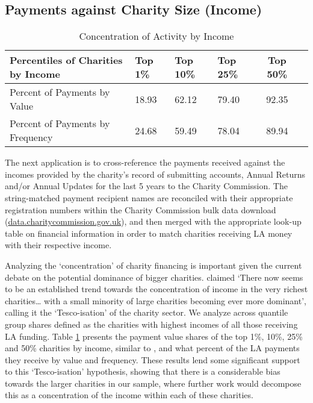 \documentclass[11pt]{article}
\begin{document}
\subsection{Payments against Charity Size (Income)}

\begin{table}[!b]
\centering
\caption{Concentration of Activity by Income}
\label{concentrationtable}
\begin{tabular}{llllcc}\toprule
Percentiles of Charities by Income & Top 1\% & Top 10\% &  Top 25\% &  Top 50\% \\ \midrule
Percent of Payments by Value & 18.93 & 62.12 & 79.40 & 92.35 \\
Percent of Payments by Frequency & 24.68 & 59.49 & 78.04 & 89.94\\ \bottomrule
\end{tabular}
\end{table}

The next application is to cross-reference the payments received against the incomes provided by the charity's record of submitting accounts, Annual Returns and/or Annual Updates for the last 5 years to the Charity Commission. The string-matched payment recipient names are reconciled with their appropriate registration numbers within the Charity Commission bulk data download (\url{data.charitycommission.gov.uk}), and then merged with the appropriate look-up table on financial information in order to match charities receiving LA money with their respective income.

Analyzing the ‘concentration’ of charity financing is important given the current debate on the potential dominance of bigger charities. \cite{ids2005} claimed ‘There now seems to be an established trend towards the concentration of income in the very richest charities… with a small minority of large charities becoming ever more dominant’, calling it the `Tesco-isation’ of the charity sector. We analyze across quantile group shares defined as the charities with highest incomes of all those receiving LA funding. Table \ref{concentrationtable} presents the payment value shares of the top 1\%, 10\%, 25\% and 50\% charities by income, similar to \cite{backusandclifford2013}, and what percent of the LA payments they receive by value and frequency. These results lend some significant support to this `Tesco-isation' hypothesis, showing that there is a considerable bias towards the larger charities in our sample, where further work would decompose this as a concentration of the income within each of these charities.
			
\end{document}
